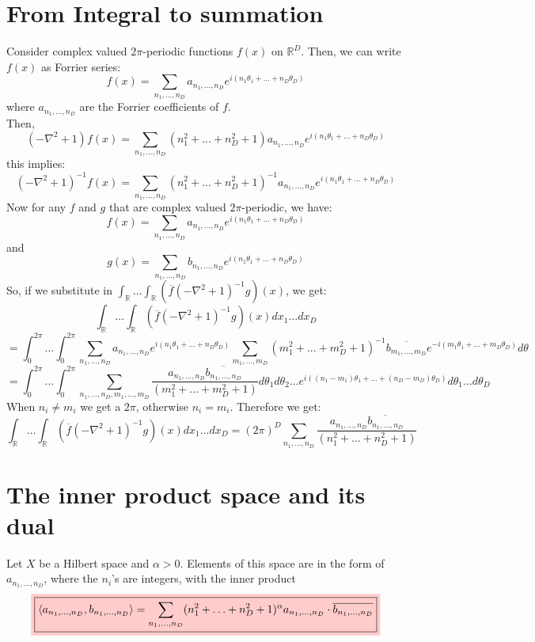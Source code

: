 \documentclass{article}
\theoremstyle{definition}
\begin{document}
\section{From Integral to summation}
Consider complex valued $2\pi$-periodic functions $f(x)$ on $\mathbb{R}^D$. Then, we can write $f(x)$ as Forrier series:
\[
f(x) = \sum_{n_1,\ldots, n_D} a_{n_1,..., n_D} e^{i(n_1 \theta_1+\ldots+n_D \theta_D)}
\]
where $a_{n_1,..., n_D}$ are the Forrier coefficients of $f$.\\
Then, 
\[
(-\nabla^2 + 1)f(x)=\sum_{n_1,\ldots, n_D} (n_1^2 +...+ n_D^2 + 1)a_{n_1,..., n_D} e^{i(n_1 \theta_1+\ldots+n_D \theta_D)}
\]
this implies:
\[
(-\nabla^2 + 1)^{-1} f(x)=\sum_{n_1,\ldots, n_D} (n_1^2 +...+ n_D^2 + 1)^{-1 }a_{n_1,..., n_D} e^{i(n_1 \theta_1+\ldots+n_D \theta_D)}
\]
Now for any $f$ and $g$ that are complex valued $2\pi$-periodic, we have:
\[
f(x) = \sum_{n_1,\ldots, n_D} a_{n_1,..., n_D} e^{i(n_1 \theta_1+\ldots+n_D \theta_D)}
\]
and
\[
g(x) = \sum_{n_1,\ldots, n_D} b_{n_1,..., n_D} e^{i(n_1 \theta_1+\ldots+n_D \theta_D)}
\]
So, if we substitute in $\int_{\mathbb{R}}\ldots\int_{\mathbb{R}} \left(\overline{f} (-\nabla^2 + 1)^{-1}g\right)(x)$, we get:
\[
\int_{\mathbb{R}}\ldots\int_{\mathbb{R}} \left(\overline{f} (-\nabla^2 + 1)^{-1}g\right)(x) dx_1 \ldots dx_D
\]
\[
=\int_{0}^{2\pi}\ldots\int_{0}^{2\pi}\sum_{n_1,\ldots, n_D} a_{n_1,..., n_D} e^{i(n_1 \theta_1+\ldots+n_D \theta_D)} \sum_{m_1,\ldots, m_D} (m_1^2 +...+ m_D^2 + 1)^{-1} \overline{b_{m_1,..., m_D}} e^{-i(m_1 \theta_1+\ldots+m_D \theta_D)} d\theta
\]
\[
=\int_{0}^{2\pi}\ldots\int_{0}^{2\pi}\sum_{n_1,\ldots, n_D,m_1,\ldots,m_D}  \frac{a_{n_1,..., n_D} \overline{b_{n_1,..., n_D}}}{(m_1^2 +...+ m_D^2 + 1)} d\theta_1d\theta_2 \ldots e^{i((n_1-m_1) \theta_1+\ldots+(n_D-m_D) \theta_D)} d\theta_1 \ldots d\theta_D
\]
When $n_i \neq m_i$ we get a $2\pi$, otherwise $n_i=m_i$. Therefore we get:
\[
\int_{\mathbb{R}}\ldots\int_{\mathbb{R}} \left(\overline{f} (-\nabla^2 + 1)^{-1}g\right)(x) dx_1 \ldots dx_D = (2\pi)^D \sum_{n_1,\ldots, n_D}  \frac{a_{n_1,..., n_D}\overline{b_{n_1,..., n_D}}}{(n_1^2 +...+ n_D^2 + 1)}
\]
\section{The inner product space and its dual}
Let $X$ be a Hilbert space and $\alpha > 0$. Elements of this space are in the form of $a_{n_1,..., n_D}$, where the $n_i$'s are integers, with the inner product 
\[
\colorbox{red!20}{\(\boxed{\langle a_{n_1,\ldots,n_D}, b_{n_1,\ldots,n_D} \rangle = \sum_{n_1,\ldots,n_D} (n_1^2 + \ldots + n_D^2 + 1)^\alpha a_{n_1,\ldots,n_D} \cdot \overline{b_{n_1,\ldots,n_D}}}\)}
\]
\end{document}
